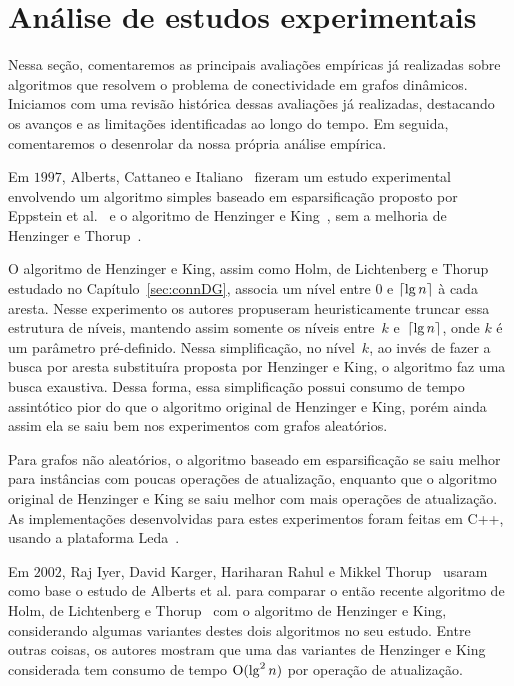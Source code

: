 \chapter{Análise de estudos experimentais}
\label{sec:conclusao}

Nessa seção, comentaremos as principais avaliações empíricas já realizadas sobre algoritmos que resolvem o problema de conectividade em grafos dinâmicos.
Iniciamos com uma revisão histórica dessas avaliações já realizadas, destacando os avanços e as limitações identificadas ao longo do tempo.
Em seguida, comentaremos o desenrolar da nossa própria análise empírica.

Em $1997$, Alberts, Cattaneo e Italiano~\cite{EmpiricalStudy1997} fizeram um estudo experimental envolvendo um algoritmo simples baseado em esparsificação proposto por Eppstein et al.~\cite{Eppstein1992SparsificationaTF} e o algoritmo de Henzinger e King~\cite{HenzingerKing}, sem a melhoria de Henzinger e Thorup~\cite{HenzingerThorup}.

O algoritmo de Henzinger e King, assim como Holm, de Lichtenberg e Thorup~\cite{poly_log} estudado no Capítulo~\ref{sec:connDG}, associa um nível entre $0$ e $\lceil{\lg n}\rceil$ à cada aresta.
Nesse experimento os autores propuseram heuristicamente truncar essa estrutura de níveis, mantendo assim somente os níveis entre~$k$ e~$\lceil{\lg n}\rceil$, onde $k$ é um parâmetro pré-definido.
Nessa simplificação, no nível~$k$, ao invés de fazer a busca por aresta substituíra proposta por Henzinger e King, o algoritmo faz uma busca exaustiva. Dessa forma, essa simplificação possui consumo de tempo assintótico pior do que o algoritmo original de Henzinger e King, porém ainda assim ela se saiu bem nos experimentos com grafos aleatórios.

Para grafos não aleatórios, o algoritmo baseado em esparsificação se saiu melhor para instâncias com poucas operações de atualização, enquanto que o algoritmo original de Henzinger e King se saiu melhor com mais operações de atualização.
As implementações desenvolvidas para estes experimentos foram feitas em C++, usando a plataforma Leda~\cite{LEDA}.

Em $2002$, Raj Iyer, David Karger, Hariharan Rahul e Mikkel Thorup~\cite{EmpiricalStudy2002} usaram como base o estudo de Alberts et al. para comparar o então recente algoritmo de Holm, de Lichtenberg e Thorup~\cite{poly_log} com o algoritmo de Henzinger e King, considerando algumas variantes destes dois algoritmos no seu estudo.
Entre outras coisas, os autores mostram que uma das variantes de Henzinger e King considerada tem consumo de tempo $\mathrm{O}(\lg^2 n)$ por operação de atualização.

